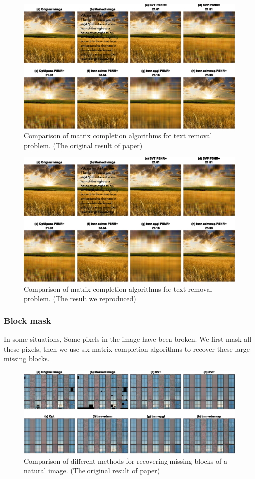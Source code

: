 \documentclass{article}
\begin{document}
{\begin{figure}[ht]
	\centering
	\includegraphics[]{./assets/fig8.eps}
	\caption{Comparison of matrix completion algorithms for text removal problem. (The original result of paper)}
	\label{fig8ori}
\end{figure}
\begin{figure}[ht]
	\centering
	\includegraphics[]{./assets/fig8.eps}
	\caption{Comparison of matrix completion algorithms for text removal problem. (The result we reproduced)}
	\label{fig8}
\end{figure}


\subsubsection{Block mask}
In some situations, Some pixels in the image have been broken. We first mask all these pixels, then we use six matrix completion algorithms to recover these large missing blocks.


\begin{figure}[ht]
	\centering
	\includegraphics[]{./assets/fig9.eps}
	\caption{Comparison of different methods for recovering missing blocks of
		a natural image. (The original result of paper)}
	\label{fig9ori}
\end{figure}

}
\end{document}
